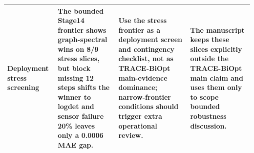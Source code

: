 \begin{table}[pos=htbp]
\begin{tabularx}{\textwidth}{>{\raggedright\arraybackslash}p{}>{\raggedright\arraybackslash}p{}>{\raggedright\arraybackslash}p{}>{\raggedright\arraybackslash}X}
Deployment stress screening & The bounded Stage14 frontier shows graph-spectral wins on 8/9 stress slices, but block missing 12 steps shifts the winner to logdet and sensor failure 20\% leaves only a 0.0006 MAE gap. & Use the stress frontier as a deployment screen and contingency checklist, not as TRACE-BiOpt main-evidence dominance; narrow-frontier conditions should trigger extra operational review. & The manuscript keeps these slices explicitly outside the TRACE-BiOpt main claim and uses them only to scope bounded robustness discussion. \\
\bottomrule
\end{tabularx}
\end{table}
